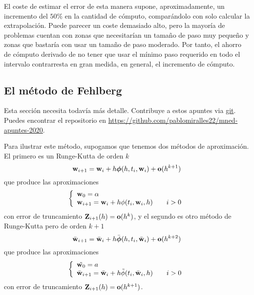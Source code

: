 \begin{remark}
    El coste de estimar el error de esta manera supone, aproximadamente,
    un incremento del $50\%$ en la cantidad de cómputo,
    comparándolo con solo calcular la extrapolación.
    Puede parecer un coste demasiado alto,
    pero la mayoría de problemas cuentan con
    zonas que necesitarían un tamaño de paso muy pequeño
    y zonas que bastaría con usar un tamaño de paso moderado.
    Por tanto, el ahorro de cómputo derivado de no tener que
    usar el mínimo paso requerido en todo el intervalo
    contrarresta en gran medida, en general,
    el incremento de cómputo.
\end{remark}  

\subsection{El método de Fehlberg}

\begin{editorial}
    Esta sección necesita todavía más detalle.
    Contribuye a estos apuntes via \href{https://git-scm.com/}{git}.
    Puedes encontrar el repositorio en
    \url{https://github.com/pablomiralles22/mned-apuntes-2020}.
\end{editorial}

Para ilustrar este método,
supogamos que tenemos dos métodos de aproximación.
El primero es un Runge-Kutta de orden $k$
\begin{equation*}
    \vb{w}_{i+1} = \vb{w}_i + h\vb*{\phi}(h, t_i, \vb{w}_i) + \vb{o}(h^{k+1})
\end{equation*}
que produce las aproximaciones
\begin{equation*}
    \left\{
    \begin{array}{lll}
    \vb{w}_0 = \alpha & & \\
    \vb{w}_{i+1} = \vb{w}_i + h\phi(t_i, \vb{w}_i, h) & & i >0
    \end{array}
    \right.
\end{equation*}
con error de truncamiento $\vb{Z}_{i+1}(h) = \vb{o}(h^k)$,
y el segundo es otro método de Runge-Kutta pero de orden $k+1$
\begin{equation*}
    \bar{\vb{w}}_{i+1} = \bar{\vb{w}}_i + h\bar{\vb*{\phi}}(h, t_i, \bar{\vb{w}}_i) + \vb{o}(h^{k+2})
\end{equation*}
que produce las aproximaciones
\begin{equation*}
    \left\{
    \begin{array}{lll}
    \tilde{\vb{w}_0} = a & & \\
    \bar{\vb{w}}_{i+1} = \bar{\vb{w}}_i + h\tilde{\phi}(t_i, \bar{\vb{w}}_i, h) & & i >0
    \end{array}
    \right.
\end{equation*}
con error de truncamiento $\vb{Z}_{i+1}(h) = \vb{o}(h^{k+1})$.

